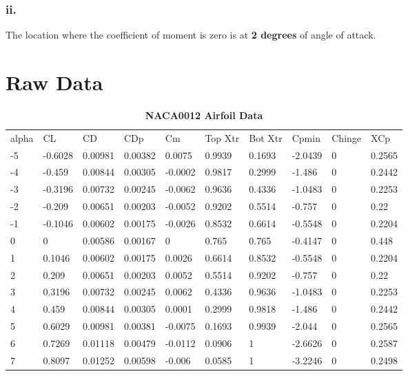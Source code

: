 \begin{singlespace}
\subsubsection{ii.}
The location where the coefficient of moment is zero is at \textbf{2 degrees} of angle of attack. 


\newpage
\section{\textbf{Raw Data}}
\begin{table}[H]
\caption{\textbf{NACA0012 Airfoil Data}} \label{table:NACA0012_raw}
\begin{tabular}{|l|l|l|l|l|l|l|l|l|l|}
alpha & CL      & CD      & CDp     & Cm      & Top Xtr & Bot Xtr & Cpmin   & Chinge & XCp    \\
-5    & -0.6028 & 0.00981 & 0.00382 & 0.0075  & 0.9939  & 0.1693  & -2.0439 & 0      & 0.2565 \\
-4    & -0.459  & 0.00844 & 0.00305 & -0.0002 & 0.9817  & 0.2999  & -1.486  & 0      & 0.2442 \\
-3    & -0.3196 & 0.00732 & 0.00245 & -0.0062 & 0.9636  & 0.4336  & -1.0483 & 0      & 0.2253 \\
-2    & -0.209  & 0.00651 & 0.00203 & -0.0052 & 0.9202  & 0.5514  & -0.757  & 0      & 0.22   \\
-1    & -0.1046 & 0.00602 & 0.00175 & -0.0026 & 0.8532  & 0.6614  & -0.5548 & 0      & 0.2204 \\
0     & 0       & 0.00586 & 0.00167 & 0       & 0.765   & 0.765   & -0.4147 & 0      & 0.448  \\
1     & 0.1046  & 0.00602 & 0.00175 & 0.0026  & 0.6614  & 0.8532  & -0.5548 & 0      & 0.2204 \\
2     & 0.209   & 0.00651 & 0.00203 & 0.0052  & 0.5514  & 0.9202  & -0.757  & 0      & 0.22   \\
3     & 0.3196  & 0.00732 & 0.00245 & 0.0062  & 0.4336  & 0.9636  & -1.0483 & 0      & 0.2253 \\
4     & 0.459   & 0.00844 & 0.00305 & 0.0001  & 0.2999  & 0.9818  & -1.486  & 0      & 0.2442 \\
5     & 0.6029  & 0.00981 & 0.00381 & -0.0075 & 0.1693  & 0.9939  & -2.044  & 0      & 0.2565 \\
6     & 0.7269  & 0.01118 & 0.00479 & -0.0112 & 0.0906  & 1       & -2.6626 & 0      & 0.2587 \\
7     & 0.8097  & 0.01252 & 0.00598 & -0.006  & 0.0585  & 1       & -3.2246 & 0      & 0.2498 \\

\end{tabular}
\end{table}
\end{singlespace}
